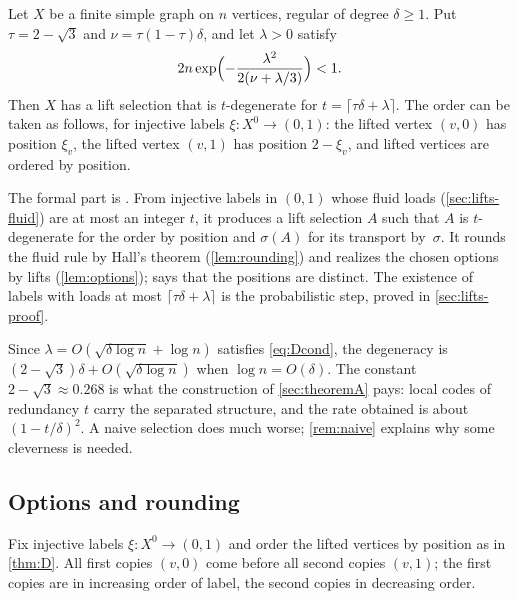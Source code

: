 \begin{theorem}[Theorem D]\label{thm:D}
Let $X$ be a finite simple graph on $n$ vertices, regular of degree $\delta\ge1$. Put $\tau=2-\sqrt3$ and
$\nu=\tau(1-\tau)\delta$, and let $\lambda>0$ satisfy
\begin{equation}\label{eq:Dcond}
  2n\exp\Bigl(-\frac{\lambda^2}{2(\nu+\lambda/3)}\Bigr)<1.
\end{equation}
Then $X$ has a lift selection that is $t$-degenerate for $t=\lceil\tau\delta+\lambda\rceil$. The order can be taken as
follows, for injective labels $\xi\colon X^0\to(0,1)$: the lifted vertex $(v,0)$ has position $\xi_v$, the lifted vertex
$(v,1)$ has position $2-\xi_v$, and lifted vertices are ordered by position.
\end{theorem}
\begin{outline}
The formal part is . From injective labels in $(0,1)$ whose fluid loads
(\cref{sec:lifts-fluid}) are at most an integer $t$, it produces a lift selection $A$ such that $A$ is $t$-degenerate
for the order by position and $\sigma(A)$ for its transport by~$\sigma$. It rounds the fluid rule by Hall's theorem
(\cref{lem:rounding}) and realizes the chosen options by lifts (\cref{lem:options}); 
says that the positions are distinct. The existence of labels with loads at most $\lceil\tau\delta+\lambda\rceil$ is the
probabilistic step, proved in \cref{sec:lifts-proof}.
\end{outline}

Since $\lambda=O(\sqrt{\delta\log n}+\log n)$ satisfies \eqref{eq:Dcond}, the degeneracy is
$(2-\sqrt3)\delta+O(\sqrt{\delta\log n})$ when $\log n=O(\delta)$. The constant $2-\sqrt3\approx0.268$ is what the
construction of \cref{sec:theoremA} pays: local codes of redundancy $t$ carry the separated structure, and the rate
obtained is about $(1-t/\delta)^2$. A naive selection does much worse; \cref{rem:naive} explains why some cleverness is
needed.

\subsection{Options and rounding}\label{sec:lifts-options}

Fix injective labels $\xi\colon X^0\to(0,1)$ and order the lifted vertices by position as in \cref{thm:D}. All first
copies $(v,0)$ come before all second copies $(v,1)$; the first copies are in increasing order of label, the second
copies in decreasing order.

